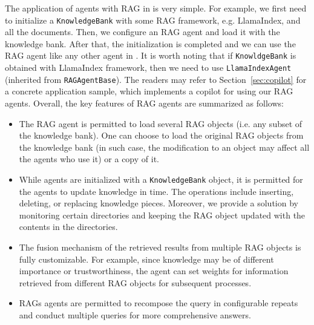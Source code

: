 The application of agents with RAG in \ours is very simple. For example, we first need to initialize a \texttt{KnowledgeBank} with some RAG framework, e.g. LlamaIndex, and all the documents. Then, we configure an RAG agent and load it with the knowledge bank. After that, the initialization is completed and we can use the RAG agent like any other agent in \ours. It is worth noting that if \texttt{KnowldgeBank} is obtained with LlamaIndex framework, then we need to use \texttt{LlamaIndexAgent} (inherited from \texttt{RAGAgentBase}). The readers may refer to Section~\ref{sec:copilot} for a concrete application sample, which implements a copilot for \ours using our RAG agents. Overall, the key features of RAG agents are summarized as follows:
\begin{itemize}
    \item The RAG agent is permitted to load several RAG objects (i.e. any subset of the knowledge bank). One can choose to load the original RAG objects from the knowledge bank (in such case, the modification to an object may affect all the agents who use it) or a copy of it.
    \item While agents are initialized with a \texttt{KnowledgeBank} object, it is permitted for the agents to update knowledge in time. The operations include inserting, deleting, or replacing knowledge pieces. Moreover, we provide a solution by monitoring certain directories and keeping the RAG object updated with the contents in the directories.
    \item The fusion mechanism of the retrieved results from multiple RAG objects is fully customizable. For example, since knowledge may be of different importance or trustworthiness, the agent can set weights for information retrieved from different RAG objects for subsequent processes. 
    \item RAGs agents are permitted to recompose the query in configurable repeats and conduct multiple queries for more comprehensive answers.
\end{itemize}